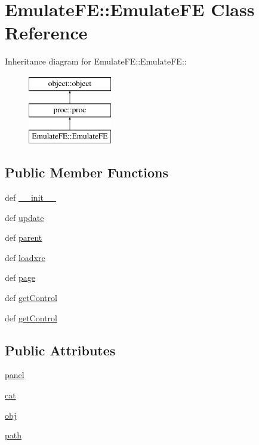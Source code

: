 \hypertarget{classEmulateFE_1_1EmulateFE}{
\section{EmulateFE::EmulateFE Class Reference}
\label{classEmulateFE_1_1EmulateFE}
}
Inheritance diagram for EmulateFE::EmulateFE::\begin{figure}[H]
\begin{center}
\leavevmode
\includegraphics[height=3cm]{classEmulateFE_1_1EmulateFE}
\end{center}
\end{figure}
\subsection*{Public Member Functions}
\begin{DoxyCompactItemize}
\item 
def \hyperlink{classEmulateFE_1_1EmulateFE_a3749dd5f45e93a8550800372a3ee40b6}{\_\-\_\-init\_\-\_\-}
\item 
def \hyperlink{classEmulateFE_1_1EmulateFE_ae73ba5d5c8b1b1fda2e5325bdfcb2eae}{update}
\item 
def \hyperlink{classproc_1_1proc_a73ad55427f28a79ef0483e18ce996e14}{parent}
\item 
def \hyperlink{classproc_1_1proc_a2192e09617c5de1798ca71123cb390bb}{loadxrc}
\item 
def \hyperlink{classproc_1_1proc_ac70ada08e4fc982a3e61e9ee77b247bf}{page}
\item 
def \hyperlink{classobject_1_1object_ac765747a2b581d48eeb94e600c31fc3f}{getControl}
\item 
def \hyperlink{classobject_1_1object_ac765747a2b581d48eeb94e600c31fc3f}{getControl}
\end{DoxyCompactItemize}
\subsection*{Public Attributes}
\begin{DoxyCompactItemize}
\item 
\hyperlink{classproc_1_1proc_a9ee372f307278c50a935b46ca00a350a}{panel}
\item 
\hyperlink{classobject_1_1object_a4fbaf843d1f40843b2c3895cb73ffada}{cat}
\item 
\hyperlink{classobject_1_1object_a15f13858ecdbf661a97a7da93d717922}{obj}
\item 
\hyperlink{classobject_1_1object_a6b4e1fd053496eafff2bc0f8aed7f089}{path}
\end{DoxyCompactItemize}



